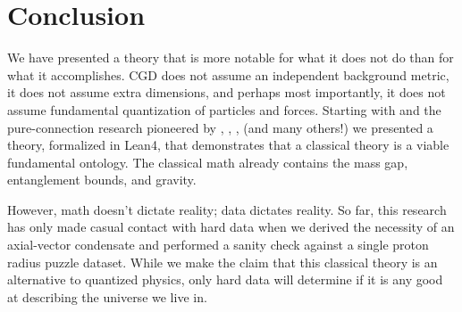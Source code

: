 
\section{Conclusion}
\label{sec:Conclusion}

We have presented a theory that is more notable for what it does not do than for what it accomplishes. CGD does not assume an independent background metric, it does not assume extra dimensions, and perhaps most importantly, it does not assume fundamental quantization of particles and forces. Starting with \spinFourC and the pure-connection research pioneered by \citet{urbantke1984integrability}, \citet{ashtekar1986new}, \citet{capovilla1989general}, \citet{krasnov2011plebanski} (and many others!) we presented a theory, formalized in Lean4, that demonstrates that a classical theory is a viable fundamental ontology. The classical math already contains the mass gap, entanglement bounds, and gravity.

However, math doesn't dictate reality; data dictates reality. So far, this research has only made casual contact with hard data when we derived the necessity of an axial-vector condensate and performed a sanity check against a single proton radius puzzle dataset. While we make the claim that this classical theory is an alternative to quantized physics, only hard data will determine if it is any good at describing the universe we live in.

